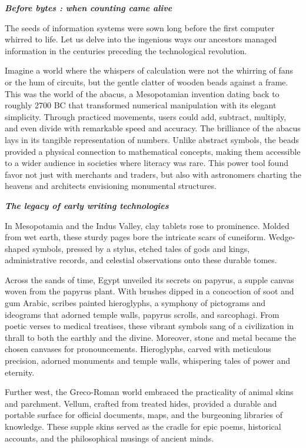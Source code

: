 \documentclass[
  letterpaper,
  DIV=11,
  numbers=noendperiod]{scrreprt}
\begin{document}
\textbf{\emph{Before bytes : when counting came alive}}

The seeds of information systems were sown long before the first
computer whirred to life. Let us delve into the ingenious ways our
ancestors managed information in the centuries preceding the
technological revolution.

Imagine a world where the whispers of calculation were not the whirring
of fans or the hum of circuits, but the gentle clatter of wooden beads
against a frame. This was the world of the abacus, a Mesopotamian
invention dating back to roughly 2700 BC that transformed numerical
manipulation with its elegant simplicity. Through practiced movements,
users could add, subtract, multiply, and even divide with remarkable
speed and accuracy. The brilliance of the abacus lays in its tangible
representation of numbers. Unlike abstract symbols, the beads provided a
physical connection to mathematical concepts, making them accessible to
a wider audience in societies where literacy was rare. This power tool
found favor not just with merchants and traders, but also with
astronomers charting the heavens and architects envisioning monumental
structures.

\textbf{\emph{The legacy of early writing technologies}}

In Mesopotamia and the Indus Valley, clay tablets rose to prominence.
Molded from wet earth, these sturdy pages bore the intricate scars of
cuneiform. Wedge-shaped symbols, pressed by a stylus, etched tales of
gods and kings, administrative records, and celestial observations onto
these durable tomes.

Across the sands of time, Egypt unveiled its secrets on papyrus, a
supple canvas woven from the papyrus plant. With brushes dipped in a
concoction of soot and gum Arabic, scribes painted hieroglyphs, a
symphony of pictograms and ideograms that adorned temple walls, papyrus
scrolls, and sarcophagi. From poetic verses to medical treatises, these
vibrant symbols sang of a civilization in thrall to both the earthly and
the divine. Moreover, stone and metal became the chosen canvases for
pronouncements. Hieroglyphs, carved with meticulous precision, adorned
monuments and temple walls, whispering tales of power and eternity.

Further west, the Greco-Roman world embraced the practicality of animal
skins and parchment. Vellum, crafted from treated hides, provided a
durable and portable surface for official documents, maps, and the
burgeoning libraries of knowledge. These supple skins served as the
cradle for epic poems, historical accounts, and the philosophical
musings of ancient minds.
\end{document}
